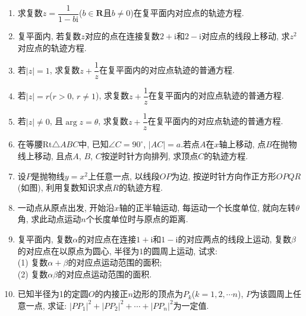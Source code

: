\documentclass[10pt,a4paper]{article}
\begin{document}
\begin{enumerate}[1.]
\item 求复数$z=\dfrac 1{1-b\mathrm{i}}$($b\in \mathbf{R}$且$b\ne 0$)在复平面内对应点的轨迹方程.
\item 复平面内, 若复数$z$对应的点在连接复数$2+\mathrm{i}$和$2-\mathrm{i}$对应点的线段上移动, 求$z^2$对应点的轨迹方程.
\item 若$|z|=1$, 求复数$z+\dfrac 1z$在复平面内的对应点轨迹的普通方程.
\item 若$|z|=r$($r>0$, $r\ne 1$), 求复数$z+\dfrac 1z$在复平面内的对应点轨迹的普通方程.
\item 若$|z|\ne 0$, 且$\arg z=\theta$, 求复数$z+\dfrac 1z$在复平面内的对应点轨迹的普通方程.
\item 在等腰$\text{Rt}\triangle ABC$中, 已知$\angle C=90^\circ$, $|AC|=a$.若点$A$在$x$轴上移动, 点$B$在抛物线上移动, 且点$A$, $B$, $C$按逆时针方向排列, 求顶点$C$的轨迹方程.
\item 设$P$是抛物线$y=x^2$上任意一点, 以线段$OP$为边, 按逆时针方向作正方形$OPQR$(如图), 利用复数知识求点$R$的轨迹方程.
\begin{center}
\end{center}
\item 一动点从原点出发, 开始沿$x$轴的正半轴运动, 每运动一个长度单位, 就向左转$\theta$角, 求此动点运动$n$个长度单位时与原点的距离.
\item 复平面内, 复数$\alpha$的对应点在连接$1+\mathrm{i}$和$1-\mathrm{i}$的对应两点的线段上运动, 复数$\beta$的对应点在以原点为圆心, 半径为$1$的圆周上运动, 试求:\\
(1) 复数$\alpha +\beta$的对应点运动范围的面积;\\
(2) 复数$\alpha \beta$的对应点运动范围的面积.
\item 已知半径为1的定圆$O$的内接正$n$边形的顶点为$P_k$($k=1,2,\cdots n$), $P$为该圆周上任意一点, 求证: $|PP_1|^2+|PP_2|^2+\cdots +|PP_n|^2$为一定值.


\end{enumerate}
\end{document}
